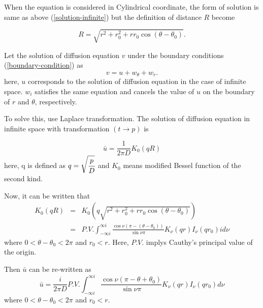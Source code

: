 \documentclass{article}
\begin{document}
When the equation is considered in Cylindrical coordinate, the form of solution
is same as above (\ref{solution-infinite}) but the definition of distance $R$ become

\begin{equation}
    R = \sqrt{r^2+r_0^2+rr_0\cos(\theta - \theta_0)}.
\end{equation}

Let the solution of diffusion equation $v$ under the boundary conditions
 (\ref{boundary-condition}) as
\begin{equation}
    v = u + w_\theta + w_r.
\end{equation}
here, $u$ corresponds to the solution of diffusion equation in the case of
 infinite space. $w_i$ satisfies the same equation and cancels the value of $u$ on
 the boundary of $r$ and $\theta$, respectively.

To solve this, use Laplace transformation.
 The solution of diffusion equation in infinite space with transformation
 $(t\rightarrow p)$ is

\begin{equation} \label{Laplace-u-solution-infinite}
    \bar{u} = \frac{1}{2\pi D}K_0(qR)
\end{equation}
here, q is defined as $q = \sqrt{\cfrac{p}{D}}$ and $K_0$ means modified Bessel
 function of the second kind.

Now, it can be written that
\begin{eqnarray}
    K_0(qR) &=& K_0\left(q\sqrt{r^2+r_0^2+rr_0\cos(\theta - \theta_0)}\right) \nonumber \\
            &=& P.V.\int^{\infty i}_{-\infty i}
                \frac{\cos\nu (\pi - (\theta - \theta_0 ))}{\sin\nu\pi}
                K_\nu(qr)I_\nu(qr_0)id\nu\label{expansion-K0}
\end{eqnarray}
where $0 < \theta - \theta_0 < 2\pi$ and $r_0 < r$.
 Here, $P.V.$ implys Cauthy's principal value of the origin.

Then $\bar{u}$ can be re-written as
\begin{equation}\label{expansion-bar-u}
    \bar{u} = \frac{i}{2\pi D}P.V.\int^{\infty i}_{-\infty i}
              \frac{\cos\nu (\pi - \theta + \theta_0)}{\sin\nu\pi}
              K_\nu(qr)I_\nu(qr_0)d\nu
\end{equation}
where $0 < \theta - \theta_0 < 2\pi$ and $r_0 < r$.
\end{document}
